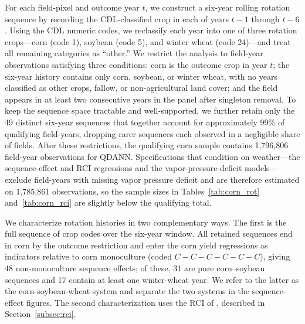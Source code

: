 \documentclass[12pt,letterpaper]{article}
\theoremstyle{remark}
\theoremstyle{remark}
\theoremstyle{plain}
\theoremstyle{definition}
\begin{document}
For each field-pixel and outcome year $t$, we construct a six-year rolling rotation sequence by recording the CDL-classified crop in each of years $t-1$ through $t-6$. Using the CDL numeric codes, we reclassify each year into one of three rotation crops---corn (code 1), soybean (code 5), and winter wheat (code 24)---and treat all remaining categories as ``other.'' We restrict the analysis to field-year observations satisfying three conditions: corn is the outcome crop in year $t$; the six-year history contains only corn, soybean, or winter wheat, with no years classified as other crops, fallow, or non-agricultural land cover; and the field appears in at least two consecutive years in the panel after singleton removal. To keep the sequence space tractable and well-supported, we further retain only the 49 distinct six-year sequences that together account for approximately 99\% of qualifying field-years, dropping rarer sequences each observed in a negligible share of fields. After these restrictions, the qualifying corn sample contains 1,796,806 field-year observations for QDANN. Specifications that condition on weather---the sequence-effect and RCI regressions and the vapor-pressure-deficit models---exclude field-years with missing vapor pressure deficit and are therefore estimated on 1,785,861 observations, so the sample sizes in Tables~\ref{tab:corn_rot} and~\ref{tab:corn_rci} are slightly below the qualifying total.

We characterize rotation histories in two complementary ways. The first is the full sequence of crop codes over the six-year window. All retained sequences end in corn by the outcome restriction and enter the corn yield regressions as indicators relative to corn monoculture (coded $C-C-C-C-C-C$), giving 48 non-monoculture sequence effects; of these, 31 are pure corn--soybean sequences and 17 contain at least one winter-wheat year. We refer to the latter as the corn-soybean-wheat system and separate the two systems in the sequence-effect figures. The second characterization uses the RCI of \citet{socolar2021}, described in Section~\ref{subsec:rci}.
\end{document}
